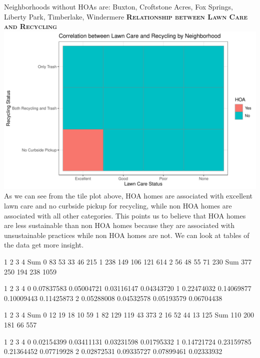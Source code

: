 \documentclass{article}
\begin{document}
Neighborhoods without HOAs are: Buxton, Croftstone Acres, Fox Springs, Liberty Park, Timberlake, Windermere
\newline
\newpage
\textsc{\textbf{Relationship between Lawn Care and Recycling}}
\newline
\newline
\includegraphics{part2-028}
\newline
As we can see from the tile plot above, HOA homes are associated with excellent lawn care and no curbside pickup for recycling, while non HOA homes are associated with all other categories. This points us to believe that HOA homes are less sustainable than non HOA homes because they are associated with unsustainable practices while non HOA homes are not. We can look at tables of the data get more insight. 
\begin{Schunk}
\begin{Soutput}
         1    2    3    4  Sum
  0     83   53   33   46  215
  1    238  149  106  121  614
  2     56   48   55   71  230
  Sum  377  250  194  238 1059
\end{Soutput}
\begin{Soutput}
             1          2          3          4
  0 0.07837583 0.05004721 0.03116147 0.04343720
  1 0.22474032 0.14069877 0.10009443 0.11425873
  2 0.05288008 0.04532578 0.05193579 0.06704438
\end{Soutput}
\begin{Soutput}
        1   2   3   4 Sum
  0    12  19  18  10  59
  1    82 129 119  43 373
  2    16  52  44  13 125
  Sum 110 200 181  66 557
\end{Soutput}
\begin{Soutput}
             1          2          3          4
  0 0.02154399 0.03411131 0.03231598 0.01795332
  1 0.14721724 0.23159785 0.21364452 0.07719928
  2 0.02872531 0.09335727 0.07899461 0.02333932
\end{Soutput}
\end{Schunk}
\end{document}
